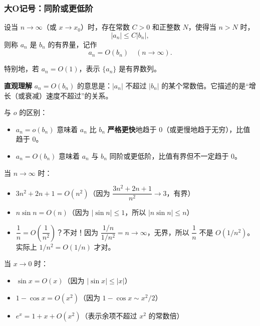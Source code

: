 \documentclass[fontset=fandol]{ctexart}
\newenvironment{custom}[1]{\par\noindent\textbf{#1}\quad}{\par\vspace{0.8em}}
\begin{document}
\subsubsection{大O记号：同阶或更低阶}

\begin{definition}[大O记号]
设当 \(n \to \infty\)（或 \(x \to x_0\)）时，存在常数 \(C > 0\) 和正整数 \(N\)，使得当 \(n > N\) 时，
\[
|a_n| \leq C |b_n|,
\]
则称 \(a_n\) 是 \(b_n\) 的有界量，记作
\[
a_n = O(b_n) \quad (n \to \infty).
\]

特别地，若 \(a_n = O(1)\)，表示 \(\{a_n\}\) 是有界数列。
\end{definition}

\begin{custom}{直观理解}
\(a_n = O(b_n)\) 的意思是：\(|a_n|\) 不超过 \(|b_n|\) 的某个常数倍。它描述的是“增长（或衰减）速度不超过”的关系。

与 \(o\) 的区别：
\begin{itemize}
\item \(a_n = o(b_n)\) 意味着 \(a_n\) 比 \(b_n\) \textbf{严格更快}地趋于 0（或更慢地趋于无穷），比值趋于 0。
\item \(a_n = O(b_n)\) 意味着 \(a_n\) 与 \(b_n\) 同阶或更低阶，比值有界但不一定趋于 0。
\end{itemize}
\end{custom}

\begin{example}[大O记号的例子]
当 \(n \to \infty\) 时：
\begin{itemize}
\item \(3n^2 + 2n + 1 = O(n^2)\)（因为 \(\dfrac{3n^2+2n+1}{n^2} \to 3\)，有界）
\item \(n \sin n = O(n)\)（因为 \(|\sin n| \leq 1\)，所以 \(|n \sin n| \leq n\)）
\item \(\dfrac{1}{n} = O\left(\dfrac{1}{n^2}\right)\)？不对！因为 \(\dfrac{1/n}{1/n^2} = n \to \infty\)，无界，所以 \(\dfrac{1}{n}\) 不是 \(O(1/n^2)\)。实际上 \(1/n^2 = O(1/n)\) 才对。
\end{itemize}

当 \(x \to 0\) 时：
\begin{itemize}
\item \(\sin x = O(x)\)（因为 \(|\sin x| \leq |x|\)）
\item \(1 - \cos x = O(x^2)\)（因为 \(1-\cos x \sim x^2/2\)）
\item \(e^x = 1 + x + O(x^2)\)（表示余项不超过 \(x^2\) 的常数倍）
\end{itemize}
\end{example}
\end{document}
